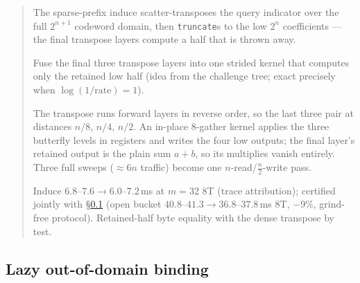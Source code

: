 \documentclass[11pt]{article}
\newcommand{\code}[1]{\texttt{#1}}
\newenvironment{optsummary}{%
  \begin{quote}\small
  \begin{description}
  \setlength{\itemsep}{1pt}\setlength{\parsep}{0pt}\setlength{\topsep}{2pt}
}{%
  \end{description}
  \end{quote}
}
\begin{document}
\begin{optsummary}
\item[Baseline:] The sparse-prefix induce scatter-transposes the query indicator over the full $2^{n+1}$ codeword domain, then \code{truncate}s to the low $2^n$ coefficients --- the final transpose layers compute a half that is thrown away.
\item[Improvement:] Fuse the final three transpose layers into one strided kernel that computes only the retained low half (idea from the challenge tree; exact precisely when $\log(1/\text{rate}) = 1$).
\item[Mechanism:] The transpose runs forward layers in reverse order, so the last three pair at distances $n/8$, $n/4$, $n/2$. An in-place 8-gather kernel applies the three butterfly levels in registers and writes the four low outputs; the final layer's retained output is the plain sum $a+b$, so its multiplies vanish entirely. Three full sweeps ($\approx6n$ traffic) become one $n$-read/$\tfrac{n}{2}$-write pass.
\item[Result:] Induce $6.8$--$7.6\to6.0$--$7.2\,$ms at $m{=}32$ 8T (trace attribution); certified jointly with \S\ref{sec:lazyood} (open bucket $40.8$--$41.3\to36.8$--$37.8\,$ms 8T, $-9\%$, grind-free protocol). Retained-half byte equality with the dense transpose by test.
\end{optsummary}

\subsection{Lazy out-of-domain binding}
\label{sec:lazyood}
\end{document}
